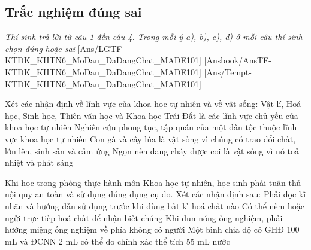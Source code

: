 \documentclass[FileMain.tex]{subfiles}
\begin{document}
\subsection{Trắc nghiệm đúng sai}\textit{\large Thí sinh trả lời từ câu 1 đến câu 4. Trong mỗi ý a), b), c), d) ở mỗi câu thí sinh chọn đúng hoặc sai}
[Ans/LGTF-KTDK_KHTN6_MoDau_DaDangChat_MADE101]
[Ansbook/AnsTF-KTDK_KHTN6_MoDau_DaDangChat_MADE101]
[Ans/Tempt-KTDK_KHTN6_MoDau_DaDangChat_MADE101]
\setcounter{ex}{0}
\begin{ex}%
Xét các nhận định về lĩnh vực của khoa học tự nhiên và về vật sống:
\choiceTF
{\True Vật lí, Hoá học, Sinh học, Thiên văn học và Khoa học Trái Đất là các lĩnh vực chủ yếu của khoa học tự nhiên}
{Nghiên cứu phong tục, tập quán của một dân tộc thuộc lĩnh vực khoa học tự nhiên}
{\True Con gà và cây lúa là vật sống vì chúng có trao đổi chất, lớn lên, sinh sản và cảm ứng}
{Ngọn nến đang cháy được coi là vật sống vì nó toả nhiệt và phát sáng}
\end{ex}

\begin{ex}%
Khi học trong phòng thực hành môn Khoa học tự nhiên, học sinh phải tuân thủ nội quy an toàn và sử dụng đúng dụng cụ đo. Xét các nhận định sau:
\choiceTF
{\True Phải đọc kĩ nhãn và hướng dẫn sử dụng trước khi dùng bất kì hoá chất nào}
{Có thể nếm hoặc ngửi trực tiếp hoá chất để nhận biết chúng}
{\True Khi đun nóng ống nghiệm, phải hướng miệng ống nghiệm về phía không có người}
{Một bình chia độ có GHĐ 100 mL và ĐCNN 2 mL có thể đo chính xác thể tích 55 mL nước}
\end{ex}
\end{document}
